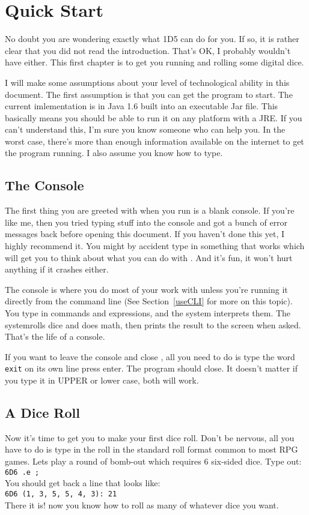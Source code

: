 \chapter{Quick Start}
\label{Quick Start}
No doubt you are wondering exactly what 1D5 can do for you.
If so, it is rather clear that you did not read the introduction. That's OK,
I probably wouldn't have either. This first chapter is to get you running and
rolling some digital dice.

I will make some assumptions about your level of technological ability in
this document. The first assumption is that you can get the program to start.
The current imlementation is in Java 1.6 built into an executable Jar file.
This basically means you should be able to run it on any platform with a JRE.
If you can't understand this, I'm sure you know someone who can help you.
In the worst case, there's more than enough information available on the
internet to get the program running. I also assume you know how to type.

\section{The Console}
\label{console}
The first thing you are greeted with when you run \progLogo is a blank console.
If you're like me, then you tried typing stuff into the console and got a
bunch of error messages back before opening this document. If you haven't
done this yet, I highly recommend it. You might by accident type in something
that works which will get you to think about what you can do with \progLogo.
And it's fun, it won't hurt anything if it crashes either.

The console is where you do most of your work with \progLogo unless you're
running it directly from the command line (See Section~\ref{useCLI} for more
on this topic). You type in commands and expressions, and the system
interprets them. The systemrolls dice and does math, then prints the result to
the screen when asked. That's the life of a console.

If you want to leave the console and close \progLogo, all you need to do is
type the word \texttt{exit} on its own line press enter. The program should close.
It doesn't matter if you type it in UPPER or lower case, both will work.

\section{A Dice Roll}
\label{firstRoll}
Now it's time to get you to make your first dice roll. Don't be nervous, all
you have to do is type in the roll in the standard roll format common to most
RPG games. Lets play a round of bomb-out which requires 6 six-sided dice.
Type out:\\
\indent\texttt{6D6 .e ;}\\
You should get back a line that looks like:\\
\indent\texttt{6D6 (1, 3, 5, 5, 4, 3): 21}\\
There it is! now you know how to roll as many of whatever dice you want.

